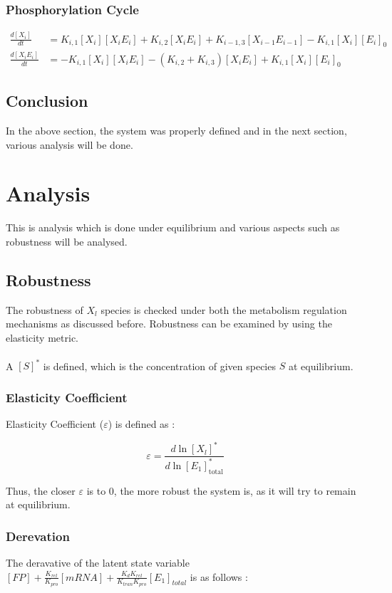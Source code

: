 \subsubsection*{Phosphorylation Cycle}
\begin{align*}
    \frac{d[X_i]}{dt} &= K_{i,1}[X_i][X_iE_i] + K_{i,2}[X_iE_i] + K_{i-1,3}[X_{i-1}E_{i-1}] - K_{i,1}[X_i][E_i]_0\\
    \frac{d[X_iE_i]}{dt} &= -K_{i,1}[X_i][X_iE_i] - (K_{i,2} + K_{i,3})[X_iE_i] + K_{i,1}[X_i][E_i]_0
\end{align*}

\subsection*{Conclusion}
In the above section, the system was properly defined and in 
the next section, various analysis will be done.

\section*{Analysis}
This is analysis which is done under equilibrium and various 
aspects such as robustness will be analysed.
\subsection*{Robustness}
The robustness of $X_l$ species is checked under both the 
metabolism regulation mechanisms as discussed before. Robustness 
can be examined by using the elasticity metric.
\\\\
A $[S]^*$ is defined, which is the concentration of given 
species $S$ at equilibrium.

\subsubsection{Elasticity Coefficient}
Elasticity Coefficient ($\varepsilon$) is defined as :

$$ \varepsilon = \frac{d \ln{[X_l]^*}}{d \ln[E_1]^*_{\text{total}}}$$

\noindent Thus, the closer $\varepsilon$ is to 0, the more 
robust the system is, as it will try to remain at equilibrium.

\subsubsection*{Derevation}
The deravative of the latent state variable 
$[FP] + \frac{K_{rel}}{K_{pro}}[mRNA] + \frac{K_dK_{rel}}{K_{tran}K_{pro}}[E_1]_{total}$ 
is as follows :

